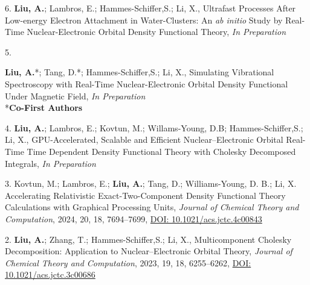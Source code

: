 


\begin{cvpublications}


\cvpublication
{6.}
{\textbf{Liu, A.}; Lambros, E.; Hammes-Schiffer,S.; Li, X., 
Ultrafast Processes After Low-energy Electron Attachment in Water-Clusters: An \textit{ab initio} Study by Real-Time Nuclear-Electronic Orbital Density Functional Theory,
\textit{In Preparation}}

\cvpublication
{5.}
{\parbox[t]{0.95\textwidth}{\strut \textbf{Liu, A.}*; Tang, D.*; Hammes-Schiffer,S.; Li, X., 
Simulating Vibrational Spectroscopy with Real-Time Nuclear-Electronic Orbital Density Functional Under Magnetic Field,
\textit{In Preparation}\\ 
\**\textbf{Co-First Authors}}}

\cvpublication
{4.} 
{\textbf{Liu, A.}; Lambros, E.; Kovtun, M.; Willams-Young, D.B; Hammes-Schiffer,S.; Li, X., 
GPU-Accelerated, Scalable and Efficient Nuclear–Electronic Orbital Real-Time Time Dependent Density Functional
Theory with Cholesky Decomposed Integrals, 
\textit{In Preparation}}

\cvpublication
{3.} 
{Kovtun, M.; Lambros, E.; \textbf{Liu, A.}; Tang, D.; Williams-Young, D. B.; Li, X. Accelerating Relativistic Exact-Two-Component Density Functional Theory Calculations with Graphical Processing Units,
\textit{Journal of Chemical Theory and Computation}, 2024, 20, 18, 7694–7699,
\href{https://doi.org/10.1021/acs.jctc.4c00843}{DOI: 10.1021/acs.jctc.4c00843}}


\cvpublication
{2.} 
{\textbf{Liu, A.}; Zhang, T.; Hammes-Schiffer,S.; Li, X., 
Multicomponent Cholesky Decomposition: Application to Nuclear–Electronic Orbital Theory, 
\textit{Journal of Chemical Theory and Computation}, 2023, 19, 18, 6255–6262, 
\href{https://pubs.acs.org/doi/10.1021/acs.jctc.3c00686}{DOI: 10.1021/acs.jctc.3c00686}}


\end{cvpublications}
